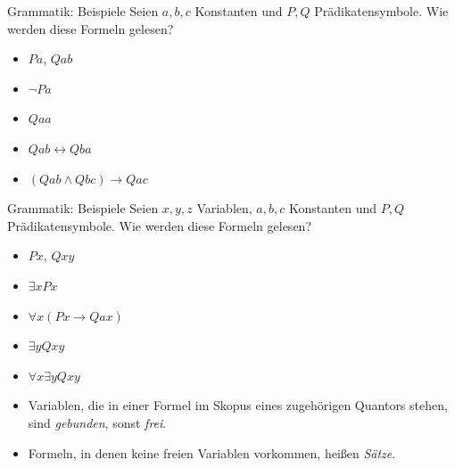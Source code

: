 \documentclass[12pt]{beamer}
\begin{document}
\begin{frame}{Grammatik: Beispiele}
  Seien $a,b,c$ Konstanten und $P,Q$ Prädikatensymbole. Wie werden
  diese Formeln gelesen?

  \begin{itemize}
  \item<2-> $Pa$, $Qab$
  \item<3-> $\neg Pa$
  \item<4-> $Qaa$
  \item<5-> $Qab \leftrightarrow Qba$
  \item<6-> $(Qab \land Qbc) \to Qac$
  \end{itemize}

\end{frame}

\begin{frame}{Grammatik: Beispiele}
  Seien $x, y, z$ Variablen, $a,b,c$ Konstanten und $P,Q$
  Prädikatensymbole. Wie werden diese Formeln gelesen?

  \begin{itemize}
  \item<2-> $Px$, $Qxy$
  \item<3-> $\exists x Px$
  \item<4-> $\forall x (Px \to Qax)$
  \item<5-> $\exists y Qxy$
  \item<6-> $\forall x \exists y Qxy$
  \end{itemize}

  \begin{itemize}
  \item<7-> Variablen, die in einer Formel im Skopus eines zugehörigen
    Quantors stehen, sind \emph{gebunden}, sonst \emph{frei}.
  \item<8-> Formeln, in denen keine freien Variablen vorkommen, heißen
    \emph{Sätze}.
  \end{itemize}
\end{frame}
\end{document}
